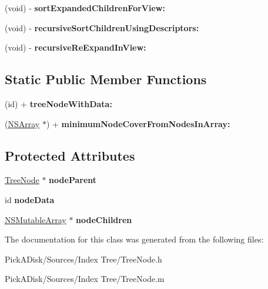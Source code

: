 \begin{DoxyCompactItemize}
\item 
\hypertarget{interface_tree_node_a5a358476403cc44e6be25f4d4a3143d8}{
(void) -\/ {\bfseries sortExpandedChildrenForView:}}
\label{interface_tree_node_a5a358476403cc44e6be25f4d4a3143d8}

\item 
\hypertarget{interface_tree_node_af10bc3de838905ccb55b55f048dd636e}{
(void) -\/ {\bfseries recursiveSortChildrenUsingDescriptors:}}
\label{interface_tree_node_af10bc3de838905ccb55b55f048dd636e}

\item 
\hypertarget{interface_tree_node_afa417a21b6885494ca94ad7dcfcaaf33}{
(void) -\/ {\bfseries recursiveReExpandInView:}}
\label{interface_tree_node_afa417a21b6885494ca94ad7dcfcaaf33}

\end{DoxyCompactItemize}
\subsection*{Static Public Member Functions}
\begin{DoxyCompactItemize}
\item 
\hypertarget{interface_tree_node_aa5809328d7640042f4dad013f5676aaa}{
(id) + {\bfseries treeNodeWithData:}}
\label{interface_tree_node_aa5809328d7640042f4dad013f5676aaa}

\item 
\hypertarget{interface_tree_node_a27fb33027e38c27320b4da4e306720be}{
(\hyperlink{class_n_s_array}{NSArray} $\ast$) + {\bfseries minimumNodeCoverFromNodesInArray:}}
\label{interface_tree_node_a27fb33027e38c27320b4da4e306720be}

\end{DoxyCompactItemize}
\subsection*{Protected Attributes}
\begin{DoxyCompactItemize}
\item 
\hypertarget{interface_tree_node_a1b707ca387ffa0d430bfca9483da739b}{
\hyperlink{interface_tree_node}{TreeNode} $\ast$ {\bfseries nodeParent}}
\label{interface_tree_node_a1b707ca387ffa0d430bfca9483da739b}

\item 
\hypertarget{interface_tree_node_a14944cf894caf1beb0ce804859dd5c4d}{
id {\bfseries nodeData}}
\label{interface_tree_node_a14944cf894caf1beb0ce804859dd5c4d}

\item 
\hypertarget{interface_tree_node_ab5c68d2c7d38a47a8a0a08ef639e5b11}{
\hyperlink{class_n_s_mutable_array}{NSMutableArray} $\ast$ {\bfseries nodeChildren}}
\label{interface_tree_node_ab5c68d2c7d38a47a8a0a08ef639e5b11}

\end{DoxyCompactItemize}


The documentation for this class was generated from the following files:\begin{DoxyCompactItemize}
\item 
PickADisk/Sources/Index Tree/TreeNode.h\item 
PickADisk/Sources/Index Tree/TreeNode.m\end{DoxyCompactItemize}
